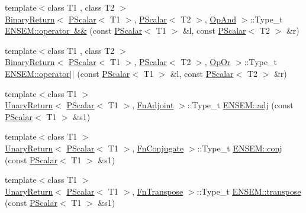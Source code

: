\begin{DoxyCompactItemize}
{\footnotesize template$<$class T1 , class T2 $>$ }\\\mbox{\hyperlink{structENSEM_1_1BinaryReturn}{Binary\+Return}}$<$ \mbox{\hyperlink{classENSEM_1_1PScalar}{P\+Scalar}}$<$ T1 $>$, \mbox{\hyperlink{classENSEM_1_1PScalar}{P\+Scalar}}$<$ T2 $>$, \mbox{\hyperlink{structENSEM_1_1OpAnd}{Op\+And}} $>$\+::Type\+\_\+t \mbox{\hyperlink{group__primscalar_ga3853388d3b3d994d263d1da57ffcb055}{E\+N\+S\+E\+M\+::operator \&\&}} (const \mbox{\hyperlink{classENSEM_1_1PScalar}{P\+Scalar}}$<$ T1 $>$ \&l, const \mbox{\hyperlink{classENSEM_1_1PScalar}{P\+Scalar}}$<$ T2 $>$ \&r)
\item 
{\footnotesize template$<$class T1 , class T2 $>$ }\\\mbox{\hyperlink{structENSEM_1_1BinaryReturn}{Binary\+Return}}$<$ \mbox{\hyperlink{classENSEM_1_1PScalar}{P\+Scalar}}$<$ T1 $>$, \mbox{\hyperlink{classENSEM_1_1PScalar}{P\+Scalar}}$<$ T2 $>$, \mbox{\hyperlink{structENSEM_1_1OpOr}{Op\+Or}} $>$\+::Type\+\_\+t \mbox{\hyperlink{group__primscalar_ga7955d37fbeaea4b15d725326bfcbc0b1}{E\+N\+S\+E\+M\+::operator$\vert$$\vert$}} (const \mbox{\hyperlink{classENSEM_1_1PScalar}{P\+Scalar}}$<$ T1 $>$ \&l, const \mbox{\hyperlink{classENSEM_1_1PScalar}{P\+Scalar}}$<$ T2 $>$ \&r)
\item 
{\footnotesize template$<$class T1 $>$ }\\\mbox{\hyperlink{structENSEM_1_1UnaryReturn}{Unary\+Return}}$<$ \mbox{\hyperlink{classENSEM_1_1PScalar}{P\+Scalar}}$<$ T1 $>$, \mbox{\hyperlink{structENSEM_1_1FnAdjoint}{Fn\+Adjoint}} $>$\+::Type\+\_\+t \mbox{\hyperlink{group__primscalar_ga7014b73d255c4b57001dd68abf3a51c3}{E\+N\+S\+E\+M\+::adj}} (const \mbox{\hyperlink{classENSEM_1_1PScalar}{P\+Scalar}}$<$ T1 $>$ \&s1)
\item 
{\footnotesize template$<$class T1 $>$ }\\\mbox{\hyperlink{structENSEM_1_1UnaryReturn}{Unary\+Return}}$<$ \mbox{\hyperlink{classENSEM_1_1PScalar}{P\+Scalar}}$<$ T1 $>$, \mbox{\hyperlink{structENSEM_1_1FnConjugate}{Fn\+Conjugate}} $>$\+::Type\+\_\+t \mbox{\hyperlink{group__primscalar_ga751a721817d2276b8eeda384b67ffa2a}{E\+N\+S\+E\+M\+::conj}} (const \mbox{\hyperlink{classENSEM_1_1PScalar}{P\+Scalar}}$<$ T1 $>$ \&s1)
\item 
{\footnotesize template$<$class T1 $>$ }\\\mbox{\hyperlink{structENSEM_1_1UnaryReturn}{Unary\+Return}}$<$ \mbox{\hyperlink{classENSEM_1_1PScalar}{P\+Scalar}}$<$ T1 $>$, \mbox{\hyperlink{structENSEM_1_1FnTranspose}{Fn\+Transpose}} $>$\+::Type\+\_\+t \mbox{\hyperlink{group__primscalar_gafa9e84efffc0a6f10d97120033276f1c}{E\+N\+S\+E\+M\+::transpose}} (const \mbox{\hyperlink{classENSEM_1_1PScalar}{P\+Scalar}}$<$ T1 $>$ \&s1)

\end{DoxyCompactItemize}
